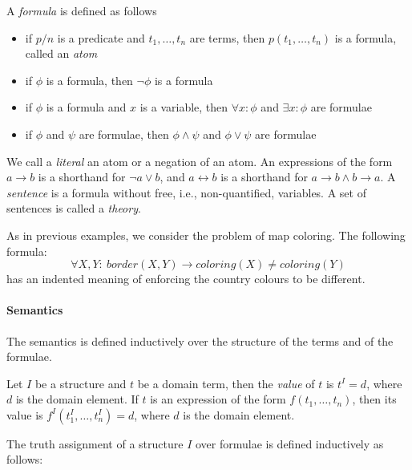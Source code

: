 A \textit{formula} is defined as follows

\begin{itemize}
  \item if $p/n$ is a predicate and $t_1,\dots,t_n$ are terms, then $p(t_1,\dots,t_n)$ is a formula, called an \textit{atom}  
  \item if $\phi$ is a formula, then $\lnot \phi$ is a formula
  \item if $\phi$ is a formula and $x$ is a variable, then $\forall x: \phi$ and $\exists x: \phi$ are formulae 
  \item if $\phi$ and $\psi$ are formulae, then $\phi \wedge \psi$ and $\phi \vee \psi$ are formulae
\end{itemize}

We call a \textit{literal} an atom or a negation of an atom. An expressions of the form $a \rightarrow b$ is a shorthand for $\lnot a \vee b$, and $a \leftrightarrow b$ is a shorthand for $a \rightarrow b \wedge b \rightarrow a$. A \textit{sentence} is a formula without free, i.e., non-quantified, variables. A set of sentences  is called a \textit{theory}.

\begin{example}[Formula]\label{example:formula}
  As in previous examples, we consider the problem of map coloring. The following formula:
  \begin{equation*}
    \forall X,Y{:}~\textit{border}(X,Y) \rightarrow \textit{coloring}(X) \neq \textit{coloring}(Y)
  \end{equation*}
has an indented meaning of enforcing the country colours to be different.
\end{example}


\paragraph{Semantics}
The semantics is defined inductively over the structure of the terms and of the formulae.

Let $I$ be a structure and $t$ be a domain term, then the \textit{value} of $t$ is $t^I = d$, where $d$ is the domain element. If $t$ is an expression of the form $f(t_1,\dots,t_n)$, then its value is $f^I(t_1^I,\dots,t_n^I)=d$, where $d$ is the domain element.

The truth assignment of a structure $I$ over formulae is defined inductively as follows:

